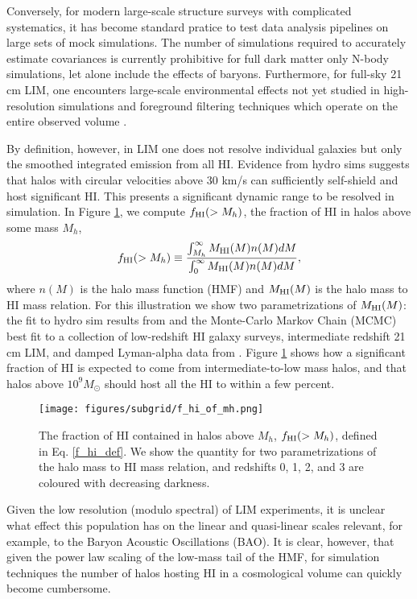 Conversely, for modern large-scale structure surveys with complicated systematics, it has become standard pratice to test data analysis pipelines on large sets of mock simulations. The number of simulations required to accurately estimate covariances is currently prohibitive for full dark matter only N-body simulations, let alone include the effects of baryons. Furthermore, for full-sky 21 cm LIM, one encounters large-scale environmental effects not yet studied in high-resolution simulations \citep{pontzenbias, tidalsims} and foreground filtering techniques which operate on the entire observed volume \cite{ffska}.

By definition, however, in LIM one does not resolve individual galaxies but only the smoothed integrated emission from all HI. Evidence from hydro sims \cite{pontzen2008, bagla2010, vn2014, illustristng21cm} suggests that halos with circular velocities above 30 km/s can sufficiently self-shield and host significant HI. This presents a significant dynamic range to be resolved in simulation. In Figure \ref{f_hi_of_mh}, we compute $f_{\rm HI}(>M_h)$, the fraction of HI in halos above some mass $M_h$, 
\begin{equation}
f_{\rm HI}(>M_h) \equiv \frac{\int_{M_h}^\infty M_{\rm HI}(M) n(M) dM}{\int_0^\infty M_{\rm HI}(M) n(M) dM}, \label{f_hi_def}
\end{equation}
where $n(M)$ is the halo mass function (HMF) and $M_{\rm HI}(M)$ is the halo mass to HI mass relation. For this illustration we show two parametrizations of $M_{\rm HI}(M)$: the fit to hydro sim results from \citeauthor{illustristng21cm} \cite{illustristng21cm} and the Monte-Carlo Markov Chain (MCMC) best fit to a collection of low-redshift HI galaxy surveys, intermediate redshift 21 cm LIM, and damped Lyman-alpha data from \citeauthor{pad2016} \cite{pad2016}. Figure \ref{f_hi_of_mh} shows how a significant fraction of HI is expected to come from intermediate-to-low mass halos, and that halos above $10^9 M_\odot$ should host all the HI to within a few percent.
\begin{figure}[h!] %
\begin{center}
\texttt{[image: figures/subgrid/f\_hi\_of\_mh.png]}%
\caption{The fraction of HI contained in halos above $M_h$, $f_{\rm HI}(>M_h)$, defined in Eq. \ref{f_hi_def}. We show the quantity for two parametrizations of the halo mass to HI mass relation, and redshifts 0, 1, 2, and 3 are coloured with decreasing darkness.}
\label{f_hi_of_mh}
\end{center}
\end{figure}
Given the low resolution (modulo spectral) of LIM experiments, it is unclear what effect this population has on the linear and quasi-linear scales relevant, for example, to the Baryon Acoustic Oscillations (BAO). It is clear, however, that given the power law scaling of the low-mass tail of the HMF, for simulation techniques the number of halos hosting HI in a cosmological volume can quickly become cumbersome.

